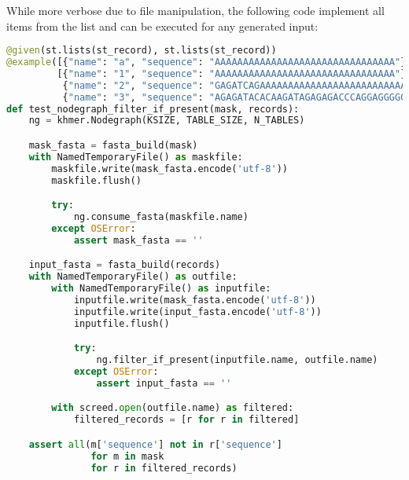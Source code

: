 \documentclass[preprint,nocopyrightspace]{sig-alternate}
\begin{document}
While more verbose due to file manipulation,
the following code implement all items from the list and can be executed for any generated input:

\begin{lstlisting}[language=Python,basicstyle=\tiny\tt,caption={filter\_if\_present Hypothesis test},label={FilterHypothesis}]
@given(st.lists(st_record), st.lists(st_record))
@example([{"name": "a", "sequence": "AAAAAAAAAAAAAAAAAAAAAAAAAAAAAAAA"}],
         [{"name": "1", "sequence": "AAAAAAAAAAAAAAAAAAAAAAAAAAAAAAAA"},
          {"name": "2", "sequence": "GAGATCAGAAAAAAAAAAAAAAAAAAAAAAAAAAAAAAAAA"},
          {"name": "3", "sequence": "AGAGATACACAAGATAGAGAGACCCAGGAGGGGG"}])
def test_nodegraph_filter_if_present(mask, records):
    ng = khmer.Nodegraph(KSIZE, TABLE_SIZE, N_TABLES)

    mask_fasta = fasta_build(mask)
    with NamedTemporaryFile() as maskfile:
        maskfile.write(mask_fasta.encode('utf-8'))
        maskfile.flush()

        try:
            ng.consume_fasta(maskfile.name)
        except OSError:
            assert mask_fasta == ''

    input_fasta = fasta_build(records)
    with NamedTemporaryFile() as outfile:
        with NamedTemporaryFile() as inputfile:
            inputfile.write(mask_fasta.encode('utf-8'))
            inputfile.write(input_fasta.encode('utf-8'))
            inputfile.flush()

            try:
                ng.filter_if_present(inputfile.name, outfile.name)
            except OSError:
                assert input_fasta == ''

        with screed.open(outfile.name) as filtered:
            filtered_records = [r for r in filtered]

    assert all(m['sequence'] not in r['sequence']
               for m in mask
               for r in filtered_records)

\end{lstlisting}


\end{document}
